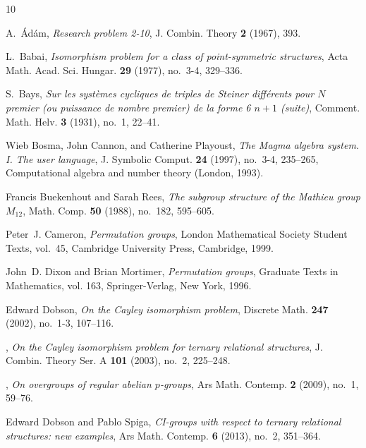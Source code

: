 \documentclass[11pt]{amsart}
\numberwithin{equation}{section}
\theoremstyle{definition}
\begin{document}
\begin{thebibliography}{10}

A.~\'Ad\'am, \emph{Research problem 2-10}, J. Combin. Theory \textbf{2} (1967),
  393.

L.~Babai, \emph{Isomorphism problem for a class of point-symmetric structures},
  Acta Math. Acad. Sci. Hungar. \textbf{29} (1977), no.~3-4, 329--336.

S.~Bays, \emph{Sur les syst\`emes cycliques de triples de {S}teiner
  diff\'erents pour {$N$} premier (ou puissance de nombre premier) de la forme
  6 {$n+1$} (suite)}, Comment. Math. Helv. \textbf{3} (1931), no.~1, 22--41.

Wieb Bosma, John Cannon, and Catherine Playoust, \emph{The {M}agma algebra
  system. {I}. {T}he user language}, J. Symbolic Comput. \textbf{24} (1997),
  no.~3-4, 235--265, Computational algebra and number theory (London, 1993).

Francis Buekenhout and Sarah Rees, \emph{The subgroup structure of the
  {M}athieu group {$M_{12}$}}, Math. Comp. \textbf{50} (1988), no.~182,
  595--605. 

Peter~J. Cameron, \emph{Permutation groups}, London Mathematical Society
  Student Texts, vol.~45, Cambridge University Press, Cambridge, 1999.

John~D. Dixon and Brian Mortimer, \emph{Permutation groups}, Graduate Texts in
  Mathematics, vol. 163, Springer-Verlag, New York, 1996. 

Edward Dobson, \emph{On the {C}ayley isomorphism problem}, Discrete Math.
  \textbf{247} (2002), no.~1-3, 107--116. 

\bysame, \emph{On the {C}ayley isomorphism problem for ternary relational
  structures}, J. Combin. Theory Ser. A \textbf{101} (2003), no.~2, 225--248.

\bysame, \emph{On overgroups of regular abelian {$p$}-groups}, Ars Math.
  Contemp. \textbf{2} (2009), no.~1, 59--76. 

Edward Dobson and Pablo Spiga, \emph{C{I}-groups with respect to ternary
  relational structures: new examples}, Ars Math. Contemp. \textbf{6} (2013),
  no.~2, 351--364. 


\end{thebibliography}
\end{document}
